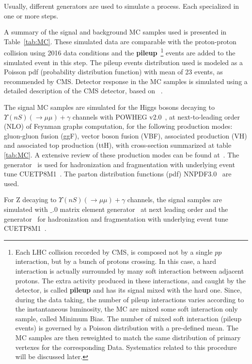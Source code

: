 Usually, different generators are used to simulate a process. Each specialized in one or more steps.

A summary of the signal and background MC samples used is presented in Table~\ref{tab:MC}. These simulated data are comparable with the proton-proton collision using 2016 data conditions and the \textbf{pileup}~\footnote{Each LHC collision recorded by CMS, is composed not by a single $pp$ interaction, but by a bunch of protons crossing. In this case, a hard interaction is actually surrounded by many soft interaction between adjacent protons. The extra activity produced in these interactions, and caught by the detector, is called \textbf{pileup} and has its signal mixed with the hard one. Since, during the data taking, the number of pileup interactions varies according to the instantaneous luminosity, the MC are mixed some soft interaction only sample, called Minimum Bias. The number of mixed soft interaction (pileup events) is governed by a Poisson distribution with a pre-defined mean. The MC samples are then reweighted to match the same distribution of primary vertexes for the corresponding Data. Systematics related to this procedure will be discussed later.} events are added to the simulated event in this step. The pileup events distribution used is modeled as a Poisson pdf (probability distribution function) with mean of 23 events, as recommended by CMS. Detector response in the MC samples is simulated using a detailed description of the CMS detector, based on \GEANTfour~\cite{Agostinelli:2002hh}.

The signal MC samples are simulated for the Higgs bosons decaying to $\Upsilon(nS) (\rightarrow \mu\mu) + \gamma$  channels with POWHEG v2.0~\cite{powheg2_1,powheg2_2,powheg2_3}, at next-to-leading order (NLO) of Feynman graphs computation, for the following production modes: gluon-gluon fusion (ggF), vector boson fusion (VBF), associated production (VH) and associated top production (ttH), with cross-section summarized at table \ref{tab:MC}. A extensive review of these production modes can be found at~\cite{DJOUADI20081}. The  generator~\cite{SJOSTRAND2008852,Sjostrand:2014zea} is used for hadronization and fragmentation with underlying event tune CUETP8M1~\cite{Khachatryan:2015pea}. The parton distribution functions (pdf) NNPDF3.0~\cite{NNPDF3} are used. 

 For Z decaying to $\Upsilon(nS) (\rightarrow \mu\mu) + \gamma$  channels, the signal samples are simulated with  $\_$.0 matrix element generator~\cite{Alwall2014} at next leading order and the  generator~\cite{SJOSTRAND2008852,Sjostrand:2014zea} for hadronization and fragmentation with underlying event tune CUETP8M1~\cite{Khachatryan:2015pea}.

